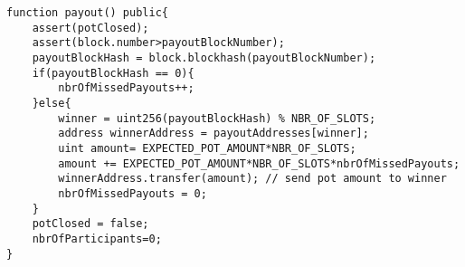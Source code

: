 \begin{lstlisting}[basicstyle=\small]
function payout() public{
    assert(potClosed);
    assert(block.number>payoutBlockNumber);
    payoutBlockHash = block.blockhash(payoutBlockNumber); 
    if(payoutBlockHash == 0){
        nbrOfMissedPayouts++;
    }else{
        winner = uint256(payoutBlockHash) % NBR_OF_SLOTS;
        address winnerAddress = payoutAddresses[winner];
        uint amount= EXPECTED_POT_AMOUNT*NBR_OF_SLOTS;
        amount += EXPECTED_POT_AMOUNT*NBR_OF_SLOTS*nbrOfMissedPayouts;
        winnerAddress.transfer(amount); // send pot amount to winner
        nbrOfMissedPayouts = 0;
    }
    potClosed = false;
    nbrOfParticipants=0;
}
\end{lstlisting}

